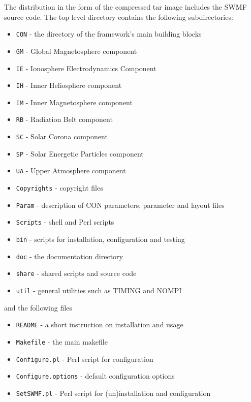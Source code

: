 The distribution in the form of the compressed tar image
includes the SWMF source code.
The top level directory contains the following subdirectories:
\begin{itemize}
\item {\tt CON}     - the directory of the framework's main building blocks
\item {\tt GM}      - Global Magnetosphere component       %
\item {\tt IE}      - Ionosphere Electrodynamics Component %
\item {\tt IH}      - Inner Heliosphere component          %
\item {\tt IM}      - Inner Magnetosphere component        %
\item {\tt RB}      - Radiation Belt component             %
\item {\tt SC}      - Solar Corona component               %
\item {\tt SP}      - Solar Energetic Particles component  %
\item {\tt UA}      - Upper Atmosphere component           %
\item {\tt Copyrights} - copyright files
\item {\tt Param}   - description of CON parameters, parameter and layout files
\item {\tt Scripts} - shell and Perl scripts
\item {\tt bin}     - scripts for installation, configuration and testing
\item {\tt doc}     - the documentation directory %
\item {\tt share}   - shared scripts and source code
\item {\tt util}    - general utilities such as TIMING and NOMPI
\end{itemize}
and the following files
\begin{itemize}
\item {\tt README}           - a short instruction on installation and usage
\item {\tt Makefile}         - the main makefile
\item {\tt Configure.pl}     - Perl script for configuration %
\item {\tt Configure.options} - default configuration options %
\item {\tt SetSWMF.pl}     - Perl script for (un)installation and configuration
\end{itemize}

